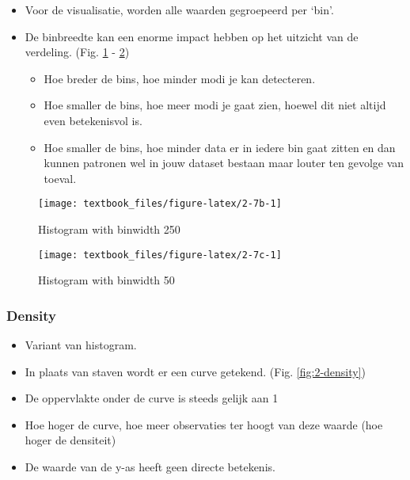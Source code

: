 \documentclass[]{tufte-book}
\providecommand{\tightlist}{%
  \setlength{\itemsep}{0pt}\setlength{\parskip}{0pt}}
\begin{document}
\begin{itemize}
\tightlist
\item
  Voor de visualisatie, worden alle waarden gegroepeerd per `bin'.
\item
  De binbreedte kan een enorme impact hebben op het uitzicht van de verdeling. (Fig. \ref{fig:2-7b} - \ref{fig:2-7c})

  \begin{itemize}
  \tightlist
  \item
    Hoe breder de bins, hoe minder modi je kan detecteren.
  \item
    Hoe smaller de bins, hoe meer modi je gaat zien, hoewel dit niet altijd even betekenisvol is.
  \item
    Hoe smaller de bins, hoe minder data er in iedere bin gaat zitten en dan kunnen patronen wel in jouw dataset bestaan maar louter ten gevolge van toeval.
  \end{itemize}
\end{itemize}

\begin{figure}
\texttt{[image: textbook\_files/figure-latex/2-7b-1]} \caption[Histogram with binwidth 250]{Histogram with binwidth 250}\label{fig:2-7b}
\end{figure}

\begin{figure}
\texttt{[image: textbook\_files/figure-latex/2-7c-1]} \caption[Histogram with binwidth 50]{Histogram with binwidth 50}\label{fig:2-7c}
\end{figure}

\hypertarget{density}{%
\subsubsection{Density}\label{density}}

\begin{itemize}
\tightlist
\item
  Variant van histogram.
\item
  In plaats van staven wordt er een curve getekend. (Fig. \ref{fig:2-density})
\item
  De oppervlakte onder de curve is steeds gelijk aan 1
\item
  Hoe hoger de curve, hoe meer observaties ter hoogt van deze waarde (hoe hoger de densiteit)
\item
  De waarde van de y-as heeft geen directe betekenis.
\end{itemize}
\end{document}
